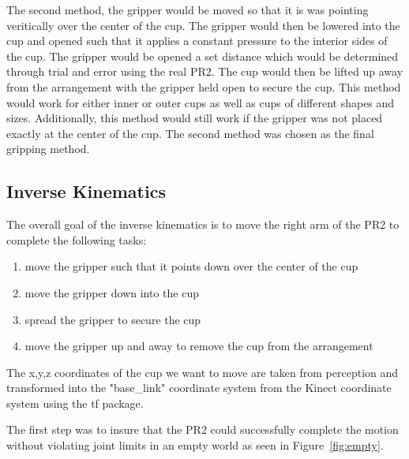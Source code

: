 \documentclass[letterpaper, 10 pt, conference]{ieeeconf}  %
\begin{document}
The second method, the gripper would be moved so that it is was pointing veritically over the center of the cup. The gripper would then be lowered into the cup and opened such that it applies a constant pressure to the interior sides of the cup. The gripper would be opened a set distance which would be determined through trial and error using the real PR2. The cup would then be lifted up away from the arrangement with the gripper held open to secure the cup. This method would work for either inner or outer cups as well as cups of different shapes and sizes. Additionally, this method would still work if the gripper was not placed exactly at the center of the cup. The second method was chosen as the final gripping method.

\subsection{Inverse Kinematics}

The overall goal of the inverse kinematics is to move the right arm of the PR2 to complete the following tasks:
\begin{enumerate}
\item move the gripper such that it points down over the center of the cup
\item move the gripper down into the cup 
\item spread the gripper to secure the cup
\item move the gripper up and away to remove the cup from the arrangement
\end{enumerate}

The x,y,z coordinates of the cup we want to move are taken from perception and transformed into the "base\_link" coordinate system from the Kinect coordinate system using the tf package.

The first step was to insure that the PR2 could successfully complete the motion without violating joint limits in an empty world as seen in Figure~\ref{fig:empty}.
\end{document}
